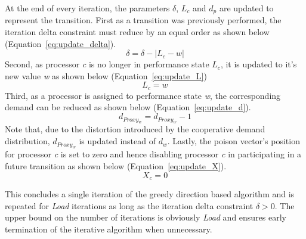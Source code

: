 At the end of every iteration, the parameters $\delta$, $L_c$ and $d_p$ are updated
to represent the transition. First as a transition was previously performed, the iteration delta constraint
must reduce by an equal order as shown below (Equation~\eqref{eq:update_delta}).
\begin{equation}
    \delta = \delta - |L_{c} - w| 
\label{eq:update_delta}
\end{equation}
Second, as processor \textit{c} is no longer in performance state $L_c$, it is updated to
it's new value \textit{w} as shown below (Equation~\eqref{eq:update_L}) 
\begin{equation}
    L_{c} = w 
\label{eq:update_L}
\end{equation}
Third, as a processor is assigned to performance state \textit{w},
the corresponding demand can be reduced as shown below (Equation~\eqref{eq:update_d}).
\begin{equation}
    d_{Proxy_w} = d_{Proxy_w} - 1 
\label{eq:update_d}
\end{equation}
Note that, due to the distortion introduced by the cooperative demand distribution, $d_{Proxy_w}$ is updated
instead of $d_w$. 
Lastly, the poison vector's position for processor
\textit{c} is set to zero and hence disabling processor \textit{c} in participating in a future transition as shown
below (Equation~\eqref{eq:update_X}).
\begin{equation}
    X_c = 0
\label{eq:update_X}
\end{equation}

This concludes a single iteration of the greedy direction based algorithm and is repeated for \textit{Load} iterations
as long as the iteration delta constraint $\delta > 0$. The upper bound on the number of iterations is obviously \textit{Load} 
and ensures early termination of the iterative algorithm when unnecessary.